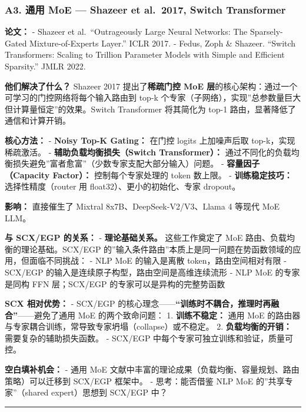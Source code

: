 \documentclass[
  12pt,
]{ctexart}
\begin{document}
\subsubsection{A3. 通用 MoE --- Shazeer et al.~2017, Switch
Transformer}\label{a3.-ux901aux7528-moe-shazeer-et-al.-2017-switch-transformer}

\textbf{论文：} - Shazeer et al.~``Outrageously Large Neural Networks:
The Sparsely-Gated Mixture-of-Experts Layer.'' ICLR 2017. - Fedus, Zoph
\& Shazeer. ``Switch Transformers: Scaling to Trillion Parameter Models
with Simple and Efficient Sparsity.'' JMLR 2022.

\textbf{他们解决了什么？} Shazeer 2017 提出了\textbf{稀疏门控 MoE
层}的核心架构：通过一个可学习的门控网络将每个输入路由到 top-k
个专家（子网络），实现''总参数量巨大但计算量恒定''的效果。Switch
Transformer 将其简化为 top-1 路由，显著降低了通信和计算开销。

\textbf{核心方法：} - \textbf{Noisy Top-K Gating：} 在门控 logits
上加噪声后取 top-k，实现稀疏激活。 - \textbf{辅助负载均衡损失（Switch
Transformer）：}
通过不同化的负载均衡损失避免''富者愈富''（少数专家支配大部分输入）问题。
- \textbf{容量因子（Capacity Factor）：} 控制每个专家处理的 token
数上限。 - \textbf{训练稳定技巧：} 选择性精度（router 用
float32）、更小的初始化、专家 dropout。

\textbf{影响：} 直接催生了 Mixtral 8x7B、DeepSeek-V2/V3、Llama 4 等现代
MoE LLM。

\textbf{与 SCX/EGP 的关系：} - \textbf{理论基础关系。} 这些工作奠定了
MoE 路由、负载均衡的理论基础。SCX/EGP
的''输入条件路由''本质上是同一问题在势函数领域的应用，但面临不同挑战： -
NLP MoE 的输入是离散 token，路由空间相对有限 - SCX/EGP
的输入是连续原子构型，路由空间是高维连续流形 - NLP MoE 的专家是同构 FFN
层；SCX/EGP 的专家可以是异构的完整势函数

\textbf{SCX 相对优势：} - SCX/EGP
的核心理念------\textbf{``训练时不耦合，推理时再融合''}------避免了通用
MoE 的两个致命问题： 1. \textbf{训练不稳定：} 通用 MoE
的路由器与专家耦合训练，常导致专家坍塌（collapse）或不稳定。 2.
\textbf{负载均衡的开销：} 需要复杂的辅助损失函数。 - SCX/EGP
中每个专家可独立训练和验证，质量可控。

\textbf{空白填补机会：} - 通用 MoE
文献中丰富的理论成果（负载均衡、容量规划、路由策略）可以迁移到 SCX/EGP
框架中。 - 思考：能否借鉴 NLP MoE 的''共享专家''（shared expert）思想到
SCX/EGP 中？

\begin{center}\rule{0.5\linewidth}{0.5pt}\end{center}
\end{document}
